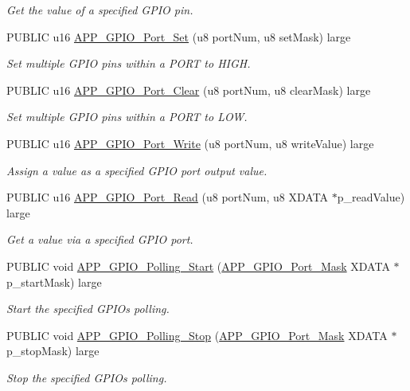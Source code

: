 \begin{DoxyCompactItemize}
\begin{DoxyCompactList}\small\item\em Get the value of a specified G\+P\+IO pin. \end{DoxyCompactList}\item 
P\+U\+B\+L\+IC u16 \hyperlink{group___g_p_i_o_gadca37fda3cec03ff8ea3f2a1f3a21170}{A\+P\+P\+\_\+\+G\+P\+I\+O\+\_\+\+Port\+\_\+\+Set} (u8 port\+Num, u8 set\+Mask) large
\begin{DoxyCompactList}\small\item\em Set multiple G\+P\+IO pins within a P\+O\+RT to H\+I\+GH. \end{DoxyCompactList}\item 
P\+U\+B\+L\+IC u16 \hyperlink{group___g_p_i_o_gab7b2deb3db0dc1dbac17141478e9d18c}{A\+P\+P\+\_\+\+G\+P\+I\+O\+\_\+\+Port\+\_\+\+Clear} (u8 port\+Num, u8 clear\+Mask) large
\begin{DoxyCompactList}\small\item\em Set multiple G\+P\+IO pins within a P\+O\+RT to L\+OW. \end{DoxyCompactList}\item 
P\+U\+B\+L\+IC u16 \hyperlink{group___g_p_i_o_ga116686b05ca9c46fc0c9ff69e2321518}{A\+P\+P\+\_\+\+G\+P\+I\+O\+\_\+\+Port\+\_\+\+Write} (u8 port\+Num, u8 write\+Value) large
\begin{DoxyCompactList}\small\item\em Assign a value as a specified G\+P\+IO port output value. \end{DoxyCompactList}\item 
P\+U\+B\+L\+IC u16 \hyperlink{group___g_p_i_o_gabde840726b6692c7d01bf6c81254f5ca}{A\+P\+P\+\_\+\+G\+P\+I\+O\+\_\+\+Port\+\_\+\+Read} (u8 port\+Num, u8 X\+D\+A\+TA $\ast$p\+\_\+read\+Value) large
\begin{DoxyCompactList}\small\item\em Get a value via a specified G\+P\+IO port. \end{DoxyCompactList}\item 
P\+U\+B\+L\+IC void \hyperlink{group___g_p_i_o_gae3f6656c2f0000d3a4c2ab1882249e33}{A\+P\+P\+\_\+\+G\+P\+I\+O\+\_\+\+Polling\+\_\+\+Start} (\hyperlink{struct_a_p_p___g_p_i_o___port___mask}{A\+P\+P\+\_\+\+G\+P\+I\+O\+\_\+\+Port\+\_\+\+Mask} X\+D\+A\+TA $\ast$p\+\_\+start\+Mask) large
\begin{DoxyCompactList}\small\item\em Start the specified G\+P\+I\+Os polling. \end{DoxyCompactList}\item 
P\+U\+B\+L\+IC void \hyperlink{group___g_p_i_o_gab5d07012fe9a4784e0d34a9ae29c2dbb}{A\+P\+P\+\_\+\+G\+P\+I\+O\+\_\+\+Polling\+\_\+\+Stop} (\hyperlink{struct_a_p_p___g_p_i_o___port___mask}{A\+P\+P\+\_\+\+G\+P\+I\+O\+\_\+\+Port\+\_\+\+Mask} X\+D\+A\+TA $\ast$p\+\_\+stop\+Mask) large
\begin{DoxyCompactList}\small\item\em Stop the specified G\+P\+I\+Os polling. \end{DoxyCompactList}\end{DoxyCompactItemize}


